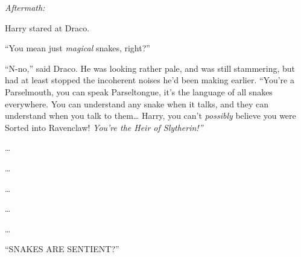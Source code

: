\emph{Aftermath:}

Harry stared at Draco.

``You mean just \emph{magical} snakes, right?''

``N-no,'' said Draco. He was looking rather pale, and was still
stammering, but had at least stopped the incoherent noises he'd been
making earlier. ``You're a Parselmouth, you can speak Parseltongue, it's
the language of all snakes everywhere. You can understand any snake when
it talks, and they can understand when you talk to them\ldots{} Harry,
you can't \emph{possibly} believe you were Sorted into Ravenclaw!
\emph{You're the Heir of Slytherin!''}

\ldots{}

\ldots{}

\ldots{}

\ldots{}

\ldots{}

``SNAKES ARE SENTIENT?''
